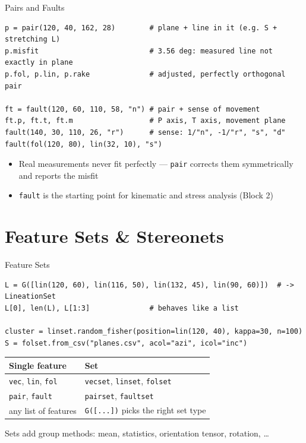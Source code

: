 \documentclass[aspectratio=169,11pt]{beamer}
\begin{document}
\begin{frame}[fragile]{Pairs and Faults}
  \begin{lstlisting}[style=python]
p = pair(120, 40, 162, 28)        # plane + line in it (e.g. S + stretching L)
p.misfit                          # 3.56 deg: measured line not exactly in plane
p.fol, p.lin, p.rake              # adjusted, perfectly orthogonal pair

ft = fault(120, 60, 110, 58, "n") # pair + sense of movement
ft.p, ft.t, ft.m                  # P axis, T axis, movement plane
fault(140, 30, 110, 26, "r")      # sense: 1/"n", -1/"r", "s", "d"
fault(fol(120, 80), lin(32, 10), "s")
  \end{lstlisting}
  \vspace{0.2cm}
  \small
  \begin{itemize}
    \item Real measurements never fit perfectly --- \texttt{pair} corrects them
          symmetrically and reports the misfit
    \item \texttt{fault} is the starting point for kinematic and stress analysis (Block 2)
  \end{itemize}
\end{frame}

\section{Feature Sets \& Stereonets}

\begin{frame}[fragile]{Feature Sets}
  \begin{lstlisting}[style=python]
L = G([lin(120, 60), lin(116, 50), lin(132, 45), lin(90, 60)])  # -> LineationSet
L[0], len(L), L[1:3]              # behaves like a list

cluster = linset.random_fisher(position=lin(120, 40), kappa=30, n=100)
S = folset.from_csv("planes.csv", acol="azi", icol="inc")
  \end{lstlisting}
  \vspace{0.2cm}
  \begin{center}
    \small
    \begin{tabular}{ll}
      \toprule
      \textbf{Single feature} & \textbf{Set} \\
      \midrule
      \texttt{vec}, \texttt{lin}, \texttt{fol} & \texttt{vecset}, \texttt{linset}, \texttt{folset} \\
      \texttt{pair}, \texttt{fault} & \texttt{pairset}, \texttt{faultset} \\
      any list of features & \texttt{G([...])} picks the right set type \\
      \bottomrule
    \end{tabular}
  \end{center}
  \small Sets add group methods: mean, statistics, orientation tensor, rotation, \ldots
\end{frame}
\end{document}
